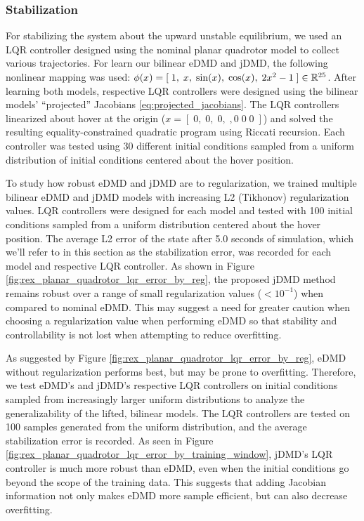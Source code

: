 \documentclass{article}
\begin{document}
\subsubsection{Stabilization}
For stabilizing the system about the upward unstable equilibrium, we used an LQR controller
designed using the nominal planar quadrotor model to collect various trajectories. For learn our bilinear eDMD and jDMD, the following nonlinear mapping was used: $\phi(x) = [\; 1,\; x,\; \sin(x),\; \cos(x),\; 2x^{2}-1\; ] \in \mathbb{R}^{25}$. After learning both models, respective LQR controllers were designed using the bilinear models' ``projected'' Jacobians \eqref{eq:projected_jacobians}. The LQR controllers linearized about hover at the origin ($x = [\;0,\; 0,\; 0,\;, 0\;  0\;  0\;]$) and solved the resulting equality-constrained quadratic program using Riccati recursion. Each controller was tested using 30 different initial
conditions sampled from a uniform distribution of initial conditions centered about the hover position.

To study how robust eDMD and jDMD are to regularization, we trained multiple bilinear eDMD and jDMD models with increasing L2 (Tikhonov) regularization values. LQR controllers were designed for each model and tested with 100 initial conditions sampled from a uniform distribution centered about the hover position. The average L2 error of the state after 5.0 seconds of simulation, which we'll refer to in this section as the stabilization error, was recorded for each model and respective LQR controller. As shown in Figure \ref{fig:rex_planar_quadrotor_lqr_error_by_reg}, the proposed jDMD method remains robust over a range of small regularization values ($<10^{-1}$) when compared to nominal eDMD. This may suggest a need for greater caution when choosing a regularization value when performing eDMD so that stability and controllability is not lost when attempting to reduce overfitting.

As suggested by Figure \ref{fig:rex_planar_quadrotor_lqr_error_by_reg}, eDMD without regularization performs best, but may be prone to overfitting. Therefore, we test eDMD's and jDMD's respective LQR controllers on initial conditions sampled from increasingly larger uniform distributions to analyze the generalizability of the lifted, bilinear models. The LQR controllers are tested on 100 samples generated from the uniform distribution, and the average stabilization error is recorded. As seen in Figure \ref{fig:rex_planar_quadrotor_lqr_error_by_training_window}, jDMD's LQR controller is much more robust than eDMD, even when the initial conditions go beyond the scope of the training data. This suggests that adding Jacobian information not only makes eDMD more sample efficient, but can also decrease overfitting. 
\end{document}
